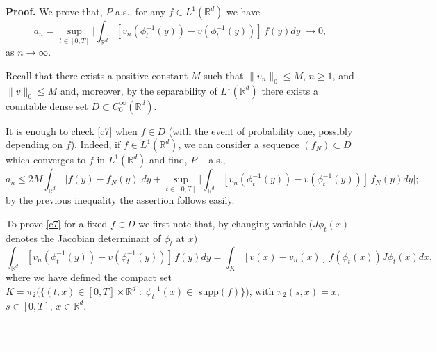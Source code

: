 \documentclass{article}
\newcommand{\RR}{\mathbb{R}}
\newenvironment{proof}[1][Proof]{\noindent\textbf{#1.} }{\ \rule{0.5em}{0.5em}}
\begin{document}
\begin{proof} We prove that, $P$-a.s.,
 for any $f \in L^{1}(\mathbb{R}^{d})$ we have
\begin{equation}
\label{c7}a_{n} = \sup_{t \in[0,T]} \Big | \int_{\mathbb{R}^{d}} [v_{n}
(\phi_{t}^{-1}( y))- v (\phi_{t}^{-1}( y))] \, f(y) dy \Big | \to 0,
\end{equation}
as $n \to\infty$.

 Recall that there exists a positive constant $M$ such that
$\| v_{n}\|_{0} \le M $, $n \ge1$, and $\| v\|_{0} \le M$ and, moreover,  by the separability of $L^1(\mathbb{R}^d)$ there exists a countable dense set $D \subset C_{0}^{\infty} (\mathbb{R}^{d})$.

It is enough to check
  \eqref{c7} when $f \in D $ (with the event of probability one, possibly depending on $f$).  Indeed,  if $f \in L^{1}(\mathbb{R}^{d})$, we can consider a sequence
$(f_{N}) \subset D$ which converges  to $f$ in
$L^{1}(\mathbb{R}^{d})$ and find, ${P}-$a.s.,
\[
a_{n} \le2 M \int_{\mathbb{R}^{d}} \, |f(y)- f_{N}(y)| dy + \sup_{t \in[0,T]}
\Big | \int_{\mathbb{R}^{d}} [v_{n} (\phi_{t}^{-1}(y))-  v (\phi_{t}^{-1}(y))]
\, f_{N}(y) dy \Big |;
\]
by the previous inequality the assertion follows easily.



\smallskip To prove \eqref{c7}  for a fixed $f \in D$ we
first note that, by changing variable ($J \phi_{t} (x) $  denotes the Jacobian determinant of
$\phi_{t}$ at $x$)
\begin{equation} \label{f5}
\int_{\mathbb{R}^{d}} [v_{n}
(\phi_{t}^{-1}( y))- v (\phi_{t}^{-1}( y))] \, f(y) dy
=   \int_{K} [v (x)-  v_{n} (x)] \,  f(\phi_{ t} (x)) J
\phi_{ t} (x) dx,
\end{equation}
where we have defined the compact set $K = \pi_2 (\{(t,x) \in[0,T]\times\mathbb{R}^{d}
\; :\; \phi_{t}^{-1}(x) \in$ supp$(f) \})$, with $\pi_2(s,x)=x$, $s \in [0,T]$, $x \in \mathbb{R}^d$.


\end{proof}
\end{document}
